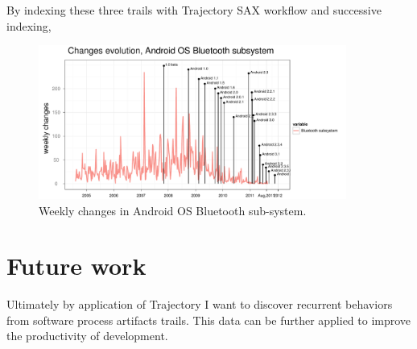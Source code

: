 \documentclass[a4paper,10pt]{article}
\numberwithin{equation}{subsection}
\begin{document}
By indexing these three trails with Trajectory SAX workflow and successive indexing,

\begin{figure}[htb]
  \centering
  \includegraphics[width=0.9\textwidth]{figures/bluetooth_changes.pdf}
  \caption{Weekly changes in Android OS Bluetooth sub-system.}
  \label{fig:bluetooth_changes}
\end{figure}



\section{Future work}
Ultimately by application of Trajectory I want to discover recurrent behaviors from
software process artifacts trails. This data can be further applied to improve the
productivity of development.
\end{document}
